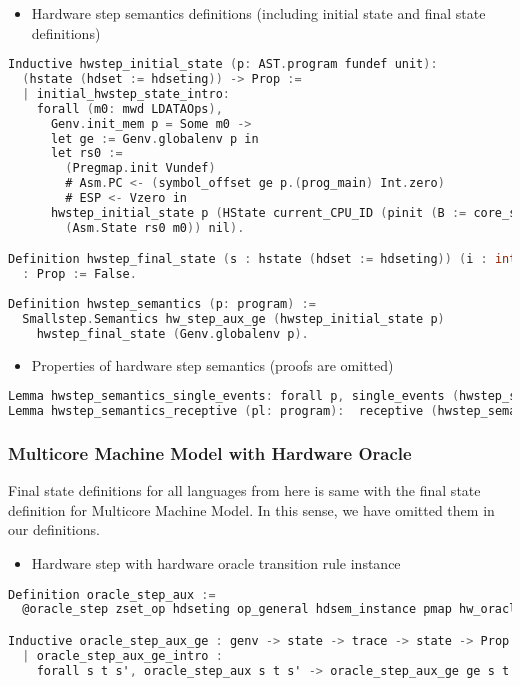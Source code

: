 \begin{itemize}[leftmargin=*]
\item Hardware step semantics definitions (including initial state and final state definitions)
\end{itemize}
\begin{lstlisting}[language=C]    
Inductive hwstep_initial_state (p: AST.program fundef unit): 
  (hstate (hdset := hdseting)) -> Prop := 
  | initial_hwstep_state_intro: 
    forall (m0: mwd LDATAOps),
      Genv.init_mem p = Some m0 ->
      let ge := Genv.globalenv p in
      let rs0 :=
        (Pregmap.init Vundef)
        # Asm.PC <- (symbol_offset ge p.(prog_main) Int.zero)
        # ESP <- Vzero in
      hwstep_initial_state p (HState current_CPU_ID (pinit (B := core_set)
        (Asm.State rs0 m0)) nil).

Definition hwstep_final_state (s : hstate (hdset := hdseting)) (i : int) 
  : Prop := False.
      
Definition hwstep_semantics (p: program) :=
  Smallstep.Semantics hw_step_aux_ge (hwstep_initial_state p) 
    hwstep_final_state (Genv.globalenv p).
\end{lstlisting}
    
\begin{itemize}[leftmargin=*]
\item Properties of hardware step semantics (proofs are omitted)
\end{itemize}
\begin{lstlisting}[language=C]    
Lemma hwstep_semantics_single_events: forall p, single_events (hwstep_semantics p).
Lemma hwstep_semantics_receptive (pl: program):  receptive (hwstep_semantics pl).
\end{lstlisting}

\subsubsection{Multicore Machine Model with Hardware Oracle}

Final state definitions for all languages from here is same with the final state definition for Multicore Machine Model. In this sense, 
we have omitted them in our definitions. 

\begin{itemize}[leftmargin=*]
\item Hardware step with hardware oracle transition rule instance
\end{itemize}
\begin{lstlisting}[language=C]
Definition oracle_step_aux :=
  @oracle_step zset_op hdseting op_general hdsem_instance pmap hw_oracle.

Inductive oracle_step_aux_ge : genv -> state -> trace -> state -> Prop :=
  | oracle_step_aux_ge_intro : 
    forall s t s', oracle_step_aux s t s' -> oracle_step_aux_ge ge s t s'.
\end{lstlisting}

